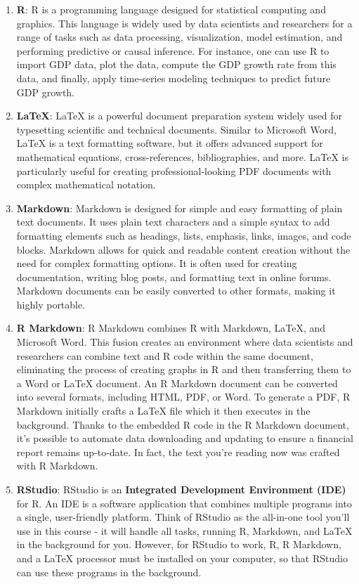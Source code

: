 \documentclass[
]{book}
\begin{document}
\begin{enumerate}
\def\labelenumi{\arabic{enumi}.}
\item
  \textbf{R}: R is a programming language designed for statistical computing and graphics. This language is widely used by data scientists and researchers for a range of tasks such as data processing, visualization, model estimation, and performing predictive or causal inference. For instance, one can use R to import GDP data, plot the data, compute the GDP growth rate from this data, and finally, apply time-series modeling techniques to predict future GDP growth.
\item
  \textbf{LaTeX}: LaTeX is a powerful document preparation system widely used for typesetting scientific and technical documents. Similar to Microsoft Word, LaTeX is a text formatting software, but it offers advanced support for mathematical equations, cross-references, bibliographies, and more. LaTeX is particularly useful for creating professional-looking PDF documents with complex mathematical notation.
\item
  \textbf{Markdown}: Markdown is designed for simple and easy formatting of plain text documents. It uses plain text characters and a simple syntax to add formatting elements such as headings, lists, emphasis, links, images, and code blocks. Markdown allows for quick and readable content creation without the need for complex formatting options. It is often used for creating documentation, writing blog posts, and formatting text in online forums. Markdown documents can be easily converted to other formats, making it highly portable.
\item
  \textbf{R Markdown}: R Markdown combines R with Markdown, LaTeX, and Microsoft Word. This fusion creates an environment where data scientists and researchers can combine text and R code within the same document, eliminating the process of creating graphs in R and then transferring them to a Word or LaTeX document. An R Markdown document can be converted into several formats, including HTML, PDF, or Word. To generate a PDF, R Markdown initially crafts a LaTeX file which it then executes in the background. Thanks to the embedded R code in the R Markdown document, it's possible to automate data downloading and updating to ensure a financial report remains up-to-date. In fact, the text you're reading now was crafted with R Markdown.
\item
  \textbf{RStudio}: RStudio is an \textbf{Integrated Development Environment (IDE)} for R. An IDE is a software application that combines multiple programs into a single, user-friendly platform. Think of RStudio as the all-in-one tool you'll use in this course - it will handle all tasks, running R, Markdown, and LaTeX in the background for you. However, for RStudio to work, R, R Markdown, and a LaTeX processor must be installed on your computer, so that RStudio can use these programs in the background.

\end{enumerate}
\end{document}
